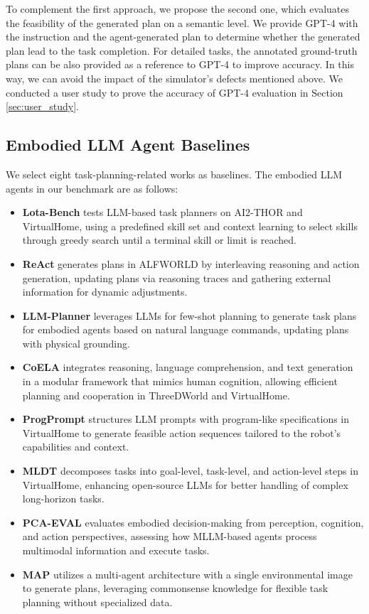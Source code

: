 To complement the first approach, we propose the second one, which evaluates the feasibility of the generated plan on a semantic level. We provide GPT-4 with the instruction and the agent-generated plan to determine whether the generated plan lead to the task completion. For detailed tasks, the annotated ground-truth plans can be also provided as a reference to GPT-4 to improve accuracy. In this way, we can avoid the impact of the simulator's defects mentioned above. We conducted a user study to prove the accuracy of GPT-4 evaluation in Section \ref{sec:user_study}.

\subsection{Embodied LLM Agent Baselines} We select eight task-planning-related works as baselines\cite{choi2024lota, yao2022react, song2023llm, brienza2024multi, singh2023progprompt, wu2024mldt, zhang2023building, chen2023towards}. The embodied LLM agents in our benchmark are as follows:

\begin{itemize}     
\item \textbf{Lota-Bench}\cite{choi2024lota} tests LLM-based task planners on AI2-THOR and VirtualHome, using a predefined skill set and context learning to select skills through greedy search until a terminal skill or limit is reached.
\item \textbf{ReAct}\cite{yao2022react} generates plans in ALFWORLD by interleaving reasoning and action generation, updating plans via reasoning traces and gathering external information for dynamic adjustments.
\item \textbf{LLM-Planner}\cite{song2023llm} leverages LLMs for few-shot planning to generate task plans for embodied agents based on natural language commands, updating plans with physical grounding.
\item \textbf{CoELA}\cite{zhang2023building} integrates reasoning, language comprehension, and text generation in a modular framework that mimics human cognition, allowing efficient planning and cooperation in ThreeDWorld and VirtualHome. 
\item \textbf{ProgPrompt}\cite{singh2023progprompt} structures LLM prompts with program-like specifications in VirtualHome to generate feasible action sequences tailored to the robot's capabilities and context.
\item \textbf{MLDT}\cite{wu2024mldt} decomposes tasks into goal-level, task-level, and action-level steps in VirtualHome, enhancing open-source LLMs for better handling of complex long-horizon tasks.
\item \textbf{PCA-EVAL}\cite{chen2023towards} evaluates embodied decision-making from perception, cognition, and action perspectives, assessing how MLLM-based agents process multimodal information and execute tasks.
\item \textbf{MAP}\cite{brienza2024multi} utilizes a multi-agent architecture with a single environmental image to generate plans, leveraging commonsense knowledge for flexible task planning without specialized data.
\end{itemize}

